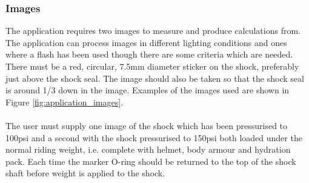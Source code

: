 		\subsubsection{Images}
			The application requires two images to measure and produce calculations from. The application can process images in different lighting conditions and ones where a flash has been used though there are some criteria which are needed. There must be a red, circular, 7.5mm diameter sticker on the shock, preferably just above the shock seal. The image should also be taken so that the shock seal is around 1/3 down in the image. Examples of the images used are shown in Figure \ref{fig:application_images}.
			\\\\
			The user must supply one image of the shock which has been pressurised to 100psi and a second with the shock pressurised to 150psi both loaded under the normal riding weight, i.e. complete with helmet,  body armour and hydration pack. Each time the marker O-ring should be returned to the top of the shock shaft before weight is applied to the shock.
